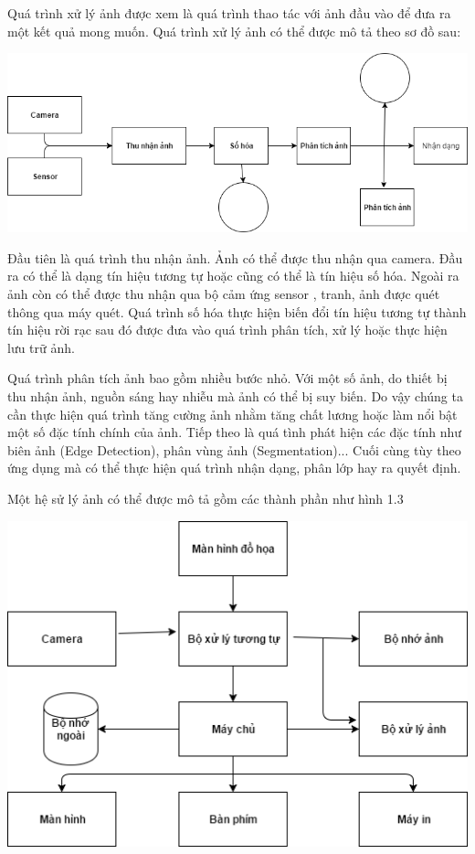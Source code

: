 \documentclass[12pt, oneside, a4]{book}
\begin{document}
Quá trình xử lý ảnh được xem là quá trình thao tác với ảnh đầu vào để đưa ra một kết quả mong muốn. Quá trình xử lý ảnh có thể được mô tả theo sơ đồ sau:
\begin{center}
\includegraphics[scale=0.5]{figure/quatrinh.png}
\end{center}
Đầu tiên là quá trình thu nhận ảnh. Ảnh có thể được thu nhận qua camera. Đầu ra có thể là dạng tín hiệu tương tự hoặc cũng có thể là tín hiệu số hóa. Ngoài ra ảnh còn có thể được thu nhận qua bộ cảm ứng sensor , tranh, ảnh được quét thông qua máy quét.
Quá trình số hóa thực hiện biến đổi tín hiệu tương tự thành tín hiệu rời rạc sau đó được đưa vào quá trình phân tích, xử lý hoặc thực hiện lưu trữ ảnh.

Quá trình phân tích ảnh bao gồm nhiều bước nhỏ. Với một số ảnh, do thiết bị thu nhận ảnh, nguồn sáng hay nhiễu mà ảnh có thể bị suy biến. Do vậy chúng ta cần thực hiện quá trình tăng cường ảnh nhằm tăng chất lương hoặc làm nổi bật một số đặc tính chính của ảnh. Tiếp theo là quá tình phát hiện các đặc tính như biên ảnh (Edge Detection), phân vùng ảnh (Segmentation)...
Cuối cùng tùy theo ứng dụng mà có thể thực hiện quá trình nhận dạng, phân lớp hay ra quyết định.
 
Một hệ sử lý ảnh có thể được mô tả gồm các thành phần như hình 1.3
\begin{center}
\includegraphics[scale=0.7]{figure/hethong.png}
\end{center}
\end{document}
